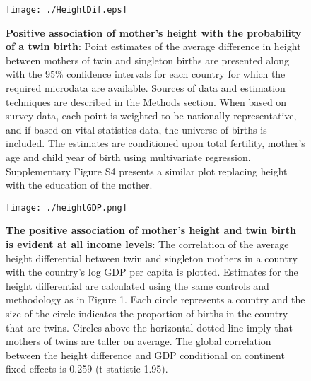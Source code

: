 \documentclass[11pt]{article}
\begin{document}
\begin{spacing}{1}
\begin{figure}[htpb!]
  \texttt{[image: ./HeightDif.eps]}
\vspace{5mm}
\caption{\textbf{Positive association of mother's height with the probability of a twin birth}: {\footnotesize Point estimates of the average difference in height between mothers of twin and singleton births are presented along with the 95\% confidence intervals for each country for which the required microdata are available. Sources of data and estimation techniques are described in the Methods section. When based on survey data, each point is weighted to be nationally representative, and if based on vital statistics data, the universe of births is included. The estimates are conditioned upon total fertility, mother's age and child year of birth using multivariate regression. Supplementary Figure S4 presents a similar plot replacing height with the education of the mother.}}
\label{fig:countryEsts}
\end{figure}


\begin{figure}[htpb!]
  \texttt{[image: ./heightGDP.png]}
\vspace{5mm}
\caption{\textbf{The positive association of mother's height and twin birth is evident at all income levels}: {\footnotesize The correlation of the average height differential between twin and singleton mothers in a country with the country's log GDP per capita is plotted.  Estimates for the height differential are calculated using the same controls and methodology as in Figure 1. Each circle represents a country and the size of the circle indicates the proportion of births in the country that are twins. Circles above the horizontal dotted line imply that mothers of twins are taller on average. The global correlation between the height difference and GDP conditional on continent fixed effects is 0.259 (t-statistic 1.95).}} 
\label{fig:GDPEsts}
\end{figure}


\end{spacing}
\end{document}
